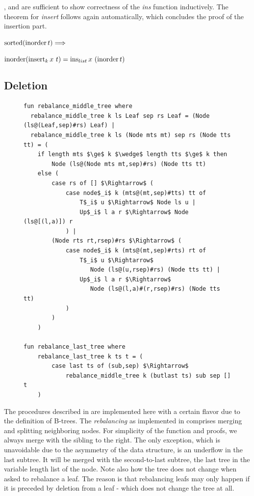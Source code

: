 ,  and  are sufficient to show correctness
of the \textit{ins} function inductively.
The theorem for \textit{insert} follows again automatically,
which concludes the proof of the insertion part.

\begin{theorem}
    \label{thm:ins-set}
    $\operatorname{sorted}  (\operatorname{inorder} t)\Longrightarrow$\\
    \begin{center}
    $\operatorname{inorder} (\operatorname{insert}_k x\ t) = \operatorname{ins}_{list} x\ (\operatorname{inorder} t)$
    \end{center}
\end{theorem}


\subsection{Deletion}


\begin{figure}
\begin{lstlisting}[mathescape=true, language=Isabelle,label={lst:rebalance-def},
    caption={The rebalancing functions}]
fun rebalance_middle_tree where
  rebalance_middle_tree k ls Leaf sep rs Leaf = (Node (ls@(Leaf,sep)#rs) Leaf) |
  rebalance_middle_tree k ls (Node mts mt) sep rs (Node tts tt) = (
    if length mts $\ge$ k $\wedge$ length tts $\ge$ k then
        Node (ls@(Node mts mt,sep)#rs) (Node tts tt)
    else (
        case rs of [] $\Rightarrow$ (
            case node$_i$ k (mts@(mt,sep)#tts) tt of
                T$_i$ u $\Rightarrow$ Node ls u |
                Up$_i$ l a r $\Rightarrow$ Node (ls@[(l,a)]) r
            ) |
        (Node rts rt,rsep)#rs $\Rightarrow$ (
            case node$_i$ k (mts@(mt,sep)#rts) rt of
                T$_i$ u $\Rightarrow$
                   Node (ls@(u,rsep)#rs) (Node tts tt) |
                Up$_i$ l a r $\Rightarrow$
                   Node (ls@(l,a)#(r,rsep)#rs) (Node tts tt)
            )
        )
    )

fun rebalance_last_tree where
    rebalance_last_tree k ts t = (
        case last ts of (sub,sep) $\Rightarrow$
            rebalance_middle_tree k (butlast ts) sub sep [] t
    )
\end{lstlisting}
\end{figure}

The procedures described in 
are implemented here with a
certain flavor due to the definition of B-trees.
The \textit{rebalancing} as implemented in 
comprises merging and splitting neighboring nodes.
For simplicity of the function and proofs, we always
merge with the sibling to the right.
The only exception, which is unavoidable due to the asymmetry of the data structure,
is an underflow in the last subtree.
It will be merged with the second-to-last subtree, the last
tree in the variable length list of the node.
Note also how the tree does not change when asked to rebalance a leaf.
The reason is that rebalancing leafs may only happen if it is preceded
by deletion from a leaf - which does not change the tree at all.


